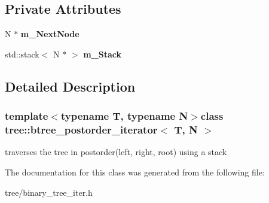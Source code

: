 \subsection*{\-Private \-Attributes}
\begin{DoxyCompactItemize}
\item 
\hypertarget{classtree_1_1btree__postorder__iterator_afdbf2d545eae73723f0d93caa427cb85}{\-N $\ast$ {\bfseries m\-\_\-\-Next\-Node}}\label{classtree_1_1btree__postorder__iterator_afdbf2d545eae73723f0d93caa427cb85}

\item 
\hypertarget{classtree_1_1btree__postorder__iterator_a696bd97e9f2496b7a0ea95867fe87dc2}{std\-::stack$<$ \-N $\ast$ $>$ {\bfseries m\-\_\-\-Stack}}\label{classtree_1_1btree__postorder__iterator_a696bd97e9f2496b7a0ea95867fe87dc2}

\end{DoxyCompactItemize}


\subsection{\-Detailed \-Description}
\subsubsection*{template$<$typename T, typename N$>$class tree\-::btree\-\_\-postorder\-\_\-iterator$<$ T, N $>$}

traverses the tree in postorder(left, right, root) using a stack 

\-The documentation for this class was generated from the following file\-:\begin{DoxyCompactItemize}
\item 
tree/binary\-\_\-tree\-\_\-iter.\-h\end{DoxyCompactItemize}
